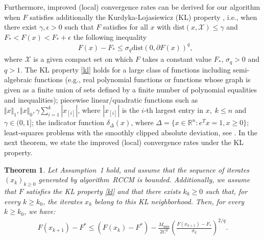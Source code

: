 \documentclass[lettersize,journal]{IEEEtran}
\newtheorem{thm}{Theorem}
\begin{document}
\noindent Furthermore, improved (local) convergence rates can be derived  for our algorithm when $F$ satisfies additionally the Kurdyka-Lojasiewicz  (KL) property \cite{bolte2007lojasiewicz}, i.e., when there exist $\gamma, \epsilon >0$ such that   $F$ satisfies for all $x$ with $\text{dist}(x, \mathcal{X}) \leq \gamma$ and $F_* < F(x) < F_* + \epsilon$ the following inequality  
	\begin{align}
    \label{kl}
		& 	F(x) - F_*  \leq \sigma_q \text{dist}(0, \partial  F(x))^q,  
	\end{align}
where  $\mathcal{X}$ is a given compact set  on which $F$ takes a constant value $F_*$, $\sigma_q>0$ and  $q>1$. The KL property \eqref{kl} holds for a large class of functions including semi-algebraic functions (e.g., real polynomial functions or functions whose graph  is given as a finite union of sets defined by a finite number of polynomial equalities and inequalities);   piecewise linear/quadratic functions such as $\Vert x\Vert _{1}, \Vert x\Vert _{0}, \gamma\sum_{i=1}^{k}|x_{[i]}|$,  where $|x_{[i]}|$ is the $i$-th largest  entry in $x, \;k\leq n$ and $\gamma \in (0, 1]$; the indicator function $\delta_{\Delta}(x)$, where $\Delta= \{x\in\mathbb{R}^n : e^T x = 1, x \geq 0\}$;  least-squares problems with the smoothly clipped absolute deviation,  see  \cite{NecCho:24, Teb:14}. In the next theorem, we state the improved (local) convergence rates under the KL property.
\begin{thm}
\label{thm:kl-decrease}
Let Assumption~1 hold, and assume that the sequence of iterates $({x_k})_{k\geq 0}$ generated by algorithm~RCCM is bounded. Additionally, we assume that $F$ satisfies the KL property \eqref{kl} and  that there exists $k_0\geq 0$ such that, for every $k\geq k_0$, the iterates $x_{k}$ belong to this KL neighborhood. Then, for every $k\geq k_0$, we have:
\begin{align}
\label{eq:kl-decrease-final}
F(x_{k+1}) \!- \!F^*
\!\leq\!
(F(x_k)
-F^*)\! -\!
\frac{M_{\min}}{2C^2}
\left(\!
\frac{F(x_{k+1})-F_*}{\sigma_q}
\!\right)^{2/q}  .
\end{align}
\end{thm}
\end{document}
